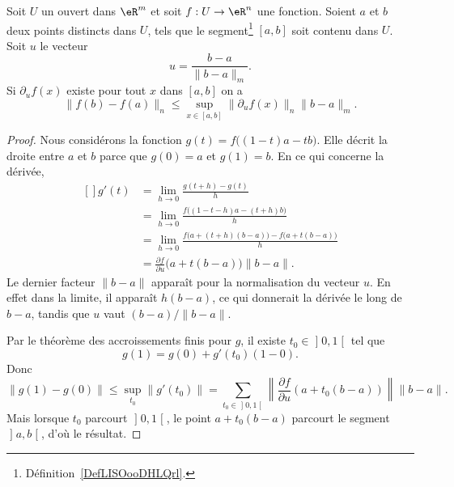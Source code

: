 \begin{theorem}      \label{val_medio_1}
	Soit \( U\) un ouvert dans \( \eR^m\) et soit \( f:U\to\eR^n\) une fonction. Soient \( a\) et \( b\) deux points distincts dans \( U\), tels que le segment\footnote{Définition~\ref{DefLISOooDHLQrl}.} \( [a,b]\) soit contenu dans \( U\). Soit \( u\) le vecteur
	\[
		u=\frac{b-a}{\|b-a\|_m}.
	\]
	Si \( \partial_u f(x)\) existe pour tout \( x\) dans \( [a,b]\) on a
	\[
		\|f(b)-f(a)\|_n\leq \sup_{x\in[a,b]}\|\partial_uf(x)\|_n\|b-a\|_m.
	\]
\end{theorem}

\begin{proof}
	Nous considérons la fonction \( g(t)=f\big( (1-t)a-tb \big)\). Elle décrit la droite entre \( a\) et \( b\) parce que \( g(0)=a\) et \( g(1)=b\). En ce qui concerne la dérivée,
	\begin{equation}
		\begin{aligned}[]
			g'(t) & =\lim_{h\to 0} \frac{ g(t+h)-g(t) }{ h }                                     \\
			      & =\lim_{h\to 0} \frac{ f\big( (1-t-h)a-(t+h)b \big) }{ h }                    \\
			      & =\lim_{h\to 0} \frac{ f\big( a+(t+h)(b-a) \big)-f\big( a+t(b-a) \big) }{ h } \\
			      & =\frac{ \partial f }{ \partial u }\big( a+t(b-a) \big)\| b-a \|.
		\end{aligned}
	\end{equation}
	Le dernier facteur \( \| b-a \|\) apparaît pour la normalisation du vecteur \( u\). En effet dans la limite, il apparaît \( h(b-a)\), ce qui donnerait la dérivée le long de \( b-a\), tandis que \( u\) vaut \( (b-a)/\| b-a \|\).

	Par le théorème des accroissements finis pour \( g\), il existe \( t_0\in\mathopen] 0 , 1 \mathclose[\) tel que
		\begin{equation}
			g(1)=g(0)+g'(t_0)(1-0).
		\end{equation}
		Donc
		\begin{equation}
			\| g(1)-g(0) \|\leq\sup_{t_0}\| g'(t_0) \|=\sum_{t_0\in\mathopen] 0 , 1 \mathclose[}\left\| \frac{ \partial f }{ \partial u }(a+t_0(b-a)) \right\|\| b-a \|.
		\end{equation}
		Mais lorsque \( t_0\) parcourt \( \mathopen] 0 , 1 \mathclose[\), le point \( a+t_0(b-a)\) parcourt le segment \( \mathopen] a , b \mathclose[\), d'où le résultat.
\end{proof}

